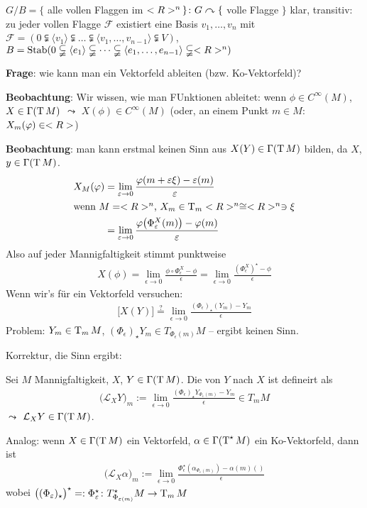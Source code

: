 $G\slash B = \lbrace$ alle vollen Flaggen im $<R>^n\,\rbrace\colon G\curvearrowright \lbrace$ volle Flagge $\rbrace$ klar, transitiv: zu jeder vollen Flagge $\mathcal F$ existiert eine Basis $v_1,\dots,v_n$ mit $\mathcal F = (0\subsetneqq \langle v_1\rangle \subsetneqq \dots \subsetneqq \langle v_1,\dots,v_{n-1}\rangle\subsetneqq V)$, $B = \operatorname{Stab}(0\subsetneqq \langle e_1\rangle \subsetneqq \dots \subsetneqq \langle e_1,\dots,e_{n-1}\rangle\subsetneqq <R>^n)$

\textbf{Frage}: wie kann man ein Vektorfeld ableiten (bzw. Ko-Vektorfeld)?

\textbf{Beobachtung}: Wir wissen, wie man FUnktionen ableitet: wenn $\phi\in C^\infty(M)$, $X\in\Gamma(\operatorname{T} M)$ $\leadsto$ $X(\phi)\in C^\infty(M)$ (oder, an einem Punkt $m\in M$: $X_m(\varphi)\in <R>$)

\textbf{Beobachtung}: man kann erstmal keinen Sinn aus $X(Y)\in\Gamma(\operatorname{T} M)$ bilden, da $X$, $y\in\Gamma(\operatorname{T} M)$. \begin{align*}
	X_M(\varphi) &= \lim\limits_{\varepsilon\to 0} \frac{\varphi(m+\varepsilon\xi) - \varepsilon(m)}{\varepsilon}\\
	\intertext{wenn $M=<R>^n$, $X_m\in\operatorname{T}_m <R>^n\cong<R>^n\ni\xi$}
		&	=\lim\limits_{\varepsilon\to 0} \frac{\varphi\big(\Phi_\varepsilon^X(m)\big) - \varphi(m)}{\varepsilon}
\end{align*}
Also auf jeder Mannigfaltigkeit stimmt punktweise \begin{align*}
	X(\phi) = \lim\limits_{\epsilon\to 0} \frac{\phi\circ \Phi^X_\epsilon-\phi}{\epsilon} = \lim\limits_{\epsilon\to 0} \frac{(\Phi_\epsilon^X)^\star-\phi}{\epsilon}
\end{align*}
Wenn wir's für ein Vektorfeld versuchen:\begin{align*}
	\big[ X(Y)\big] \overset?= \lim\limits_{\epsilon\to 0} \frac{(\Phi_\epsilon)_\star(Y_m) - Y_m}{\epsilon}
\end{align*}
Problem: $Y_m\in \operatorname{T}_m M$, $(\Phi_\epsilon)_\star Y_m\in T_{\Phi_\epsilon(m)} M$ -- ergibt keinen Sinn.

Korrektur, die Sinn ergibt:
\begin{definition}
	Sei $M$ Mannigfaltigkeit, $X$, $Y\in\Gamma(\operatorname{T} M)$. Die  von $Y$ nach $X$ ist defineirt als \begin{align*}
		\big(\mathcal L_X Y\big)_m := \lim\limits_{\epsilon\to 0} \frac{(\Phi_\epsilon)_\star Y_{\Phi_\epsilon(m)} - Y_m}{\epsilon} \in T_m M
	\end{align*}
	$\leadsto$ $\mathcal L_X Y\in\Gamma(\operatorname{T} M)$.
	
	Analog: wenn $X\in\Gamma(\operatorname{T} M)$ ein Vektorfeld, $\alpha\in\Gamma(\operatorname{T}^\star M)$ ein Ko-Vektorfeld, dann ist \begin{align*}
		\big(\mathcal L_X \alpha\big)_m := \lim\limits_{\epsilon\to 0} \frac{\Phi_\epsilon^\star(\alpha_{\Phi_\epsilon(m)}) -\alpha(m)() }{\epsilon}
\end{align*}
	wobei $\big((\Phi_\varepsilon)_\star\big)^\star =: \Phi_\varepsilon^\star\colon T^\star_{\Phi_{\varepsilon(m)}} M\to \operatorname{T}_m M$
\end{definition}

